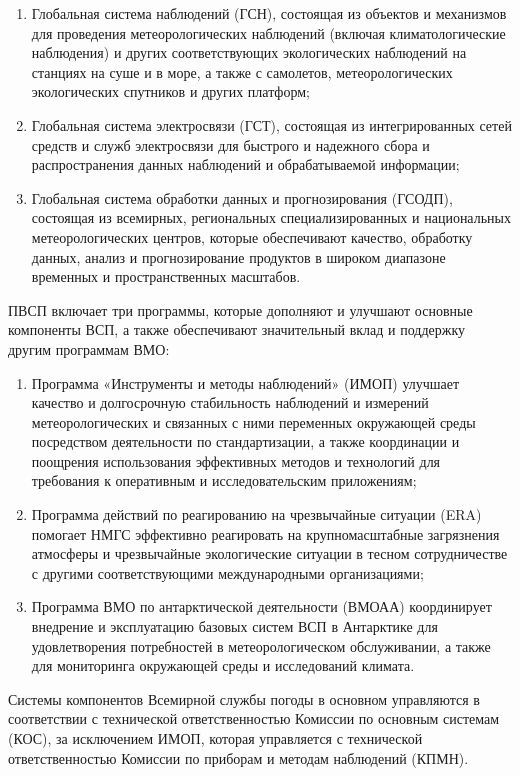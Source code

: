 \begin{enumerate}
	\item Глобальная система наблюдений (ГСН), состоящая из объектов и механизмов для проведения метеорологических наблюдений (включая климатологические наблюдения) и других соответствующих экологических наблюдений на станциях на суше и в море, а также с самолетов, метеорологических экологических спутников и других платформ;
	\item Глобальная система электросвязи (ГСТ), состоящая из интегрированных сетей средств и служб электросвязи для быстрого и надежного сбора и распространения данных наблюдений и обрабатываемой информации;
	\item Глобальная система обработки данных и прогнозирования (ГСОДП), состоящая из всемирных, региональных специализированных и национальных метеорологических центров, которые обеспечивают качество, обработку данных, анализ и прогнозирование продуктов в широком диапазоне временных и пространственных масштабов.
\end{enumerate}

ПВСП включает три программы, которые дополняют и улучшают основные компоненты ВСП, а также обеспечивают значительный вклад и поддержку другим программам ВМО: 

\begin{enumerate}
	\item Программа «Инструменты и методы наблюдений» (ИМОП) улучшает качество и долгосрочную стабильность наблюдений и измерений метеорологических и связанных с ними переменных окружающей среды посредством деятельности по стандартизации, а также координации и поощрения использования эффективных методов и технологий для требования к оперативным и исследовательским приложениям;
	\item Программа действий по реагированию на чрезвычайные ситуации (ERA) помогает НМГС эффективно реагировать на крупномасштабные загрязнения атмосферы и чрезвычайные экологические ситуации в тесном сотрудничестве с другими соответствующими международными организациями;
	\item Программа ВМО по антарктической деятельности (ВМОАА) координирует внедрение и эксплуатацию базовых систем ВСП в Антарктике для удовлетворения потребностей в метеорологическом обслуживании, а также для мониторинга окружающей среды и исследований климата.
\end{enumerate}

Системы компонентов Всемирной службы погоды в основном управляются в соответствии с технической ответственностью Комиссии по основным системам (КОС), за исключением ИМОП, которая управляется с технической ответственностью Комиссии по приборам и методам наблюдений (КПМН).

